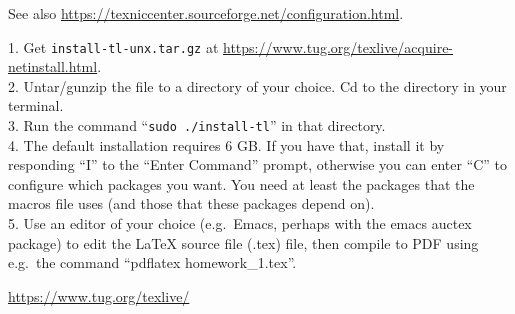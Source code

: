 \begin{mylist}
\begin{description}
See also {\small\url{https://texniccenter.sourceforge.net/configuration.html}.}
    
\item[Linux:]

  1. Get \texttt{install-tl-unx.tar.gz} at {\small \url{https://www.tug.org/texlive/acquire-netinstall.html}}.
  \\2. Untar/gunzip the file to a directory of your choice.  Cd to the directory in your terminal.
  \\3. Run the command ``\texttt{sudo~./install-tl}'' in that directory.
  \\4. The default installation requires 6 GB.  If you have that, install it by responding ``I'' to the ``Enter Command'' prompt,
  otherwise you can enter ``C'' to configure which packages you want.
  You need at least the packages that the macros file uses (and those that these packages depend on).
  \\5. Use an editor of your choice
  (e.g.~Emacs,  perhaps with the emacs auctex package)
  to edit the LaTeX source file (.tex) file,
  then compile to PDF using e.g.~the command
  ``pdflatex homework\_1.tex''.

\item[You can find more about installing LaTeX here:]
  \url{https://www.tug.org/texlive/}
  
\end{description}
\end{mylist}

\newpage

